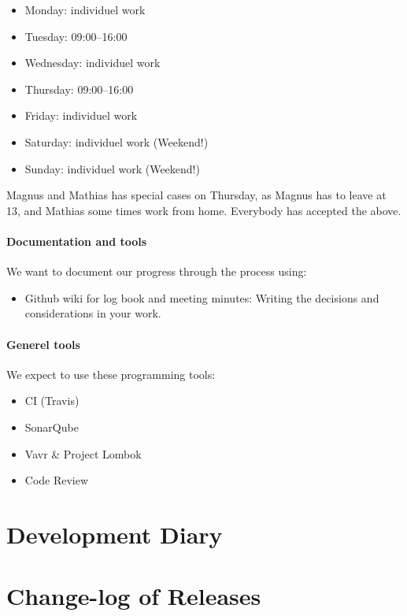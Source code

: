 \documentclass[11pt]{article}
\begin{document}
\begin{itemize}
    \item Monday: individuel work
    \item Tuesday: 09:00--16:00
    \item Wednesday: individuel work
    \item Thursday: 09:00--16:00
    \item Friday: individuel work
    \item Saturday: individuel work (Weekend!)
    \item Sunday: individuel work (Weekend!)
\end{itemize}
Magnus and Mathias has special cases on Thursday, as Magnus has to leave at 13, and Mathias some times work from home.
Everybody has accepted the above.

\paragraph{Documentation and tools}
We want to document our progress through the process using:
\begin{itemize}
    \item Github wiki for log book and meeting minutes: Writing the decisions and considerations in your work.
\end{itemize}

\paragraph{Generel tools}
We expect to use these programming tools:
\begin{itemize}
    \item CI (Travis)
    \item SonarQube
    \item Vavr & Project Lombok
    \item Code Review
\end{itemize}

\section{Development Diary}

\section{Change-log of Releases}
\end{document}
